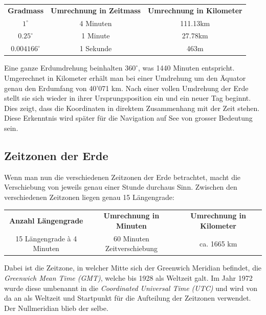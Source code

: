 \begin{refsection}
\begin{table}
\begin{center}
\renewcommand{\arraystretch}{2}
\begin{tabular}{ccc}
\textbf{Gradmass} & \textbf{Umrechnung in Zeitmass} & \textbf{Umrechnung in Kilometer}  \\
$1^{\circ}$ & 4 Minuten & 111.13km \\
$0.25^{\circ}$ & 1 Minute & 27.78km \\
$0.004166^{\circ}$ & 1 Sekunde & 463m 
\label {V7}
\end{tabular}
\end{center}
\end{table}

Eine ganze Erdumdrehung beinhalten $360 ^{\circ}$, was 1440 Minuten entspricht. Umgerechnet in Kilometer erhält man bei einer Umdrehung um den Äquator genau den Erdumfang von 40’071 km.
Nach einer vollen Umdrehung der Erde stellt sie sich wieder in ihrer Ursprungsposition ein und ein neuer Tag beginnt. Dies zeigt, dass die Koordinaten in direktem Zusammenhang mit der Zeit stehen. Diese Erkenntnis wird später für die Navigation auf See von grosser Bedeutung sein.


\subsection{Zeitzonen der Erde} \label{Zeitzonen} 
Wenn man nun die verschiedenen Zeitzonen der Erde betrachtet, macht die Verschiebung von jeweils genau einer Stunde durchaus Sinn.
Zwischen den verschiedenen Zeitzonen liegen genau 15 Längengrade:
\begin{center}
\renewcommand{\arraystretch}{1.5}
\begin{tabular}{ccc}
\textbf{Anzahl Längengrade} & \textbf{Umrechnung in Minuten} & \textbf{Umrechnung in Kilometer}  \\
15 Längengrade à 4 Minuten & 60 Minuten Zeitverschiebung & ca. 1665 km \\
\end{tabular}
\end{center}


Dabei ist die Zeitzone, in welcher Mitte sich der Greenwich Meridian befindet, die \textit{Greenwich Mean Time (GMT)}, welche bis 1928 als Weltzeit galt. Im Jahr 1972 wurde diese umbenannt in die \textit{Coordinated Universal Time (UTC)} und wird von da an als Weltzeit und Startpunkt für die Aufteilung der Zeitzonen verwendet. Der Nullmeridian blieb der selbe.



\end{refsection}
